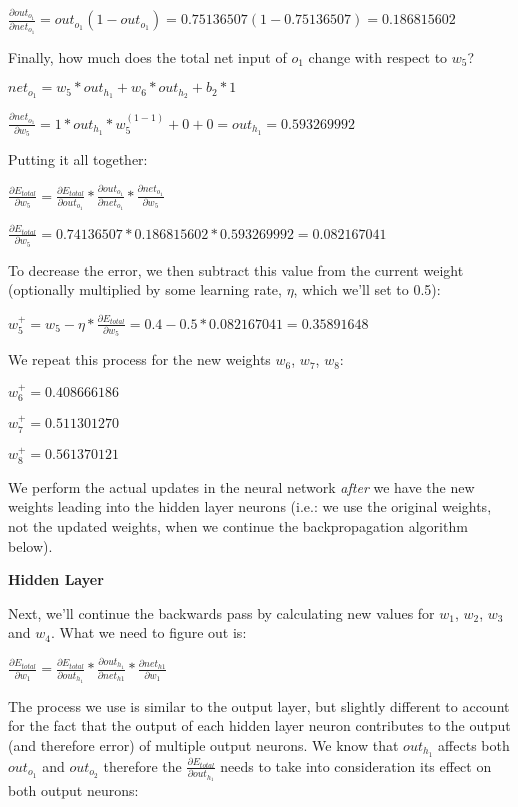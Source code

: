 \documentclass[a4paper]{article}
\begin{document}
$\frac{\partial out_{o_1}}{\partial net_{o_1}}=out_{o_1}(1-out_{o_1})=0.75136507(1-0.75136507)=0.186815602$ 

Finally, how much does the total net input of $o_1$ change with respect to $w_5$?

$net_{o_1}=w_5*out_{h_1}+w_6*out_{h_2}+b_2*1$

$\frac{\partial net_{o_1}}{\partial w_5}=1*out_{h_1}*w_5^{(1-1)}+0+0=out_{h_1}=0.593269992$ 

Putting it all together:

$\frac{\partial E_{total}}{\partial w_5} = \frac{\partial E_{total}}{\partial out_{o_1}} * \frac{\partial out_{o_1}}{\partial net_{o_1}}*\frac{\partial net_{o_1}}{\partial w_5}$

$\frac{\partial E_{total}}{\partial w_5} = 0.74136507*0.186815602*0.593269992=0.082167041$

To decrease the error, we then subtract this value from the current weight (optionally multiplied by some learning rate, $\eta$, which we'll set to 0.5):

$w_5^+=w_5-\eta*\frac{\partial E_{total}}{\partial w_5} = 0.4-0.5*0.082167041=0.35891648$

\bigskip
We repeat this process for the new weights $w_6$, $w_7$, $w_8$:

$w_6^+=0.408666186$

$w_7^+=0.511301270$

$w_8^+=0.561370121$

We perform the actual updates in the neural network \textit{after} we have the new weights leading into the hidden layer neurons (i.e.: we use the original weights, not the updated weights, when we continue the backpropagation algorithm below).

\bigskip
\textbf{Hidden Layer}

Next, we'll continue the backwards pass by calculating new values for $w_1$, $w_2$, $w_3$ and $w_4$. What we need to figure out is:

$\frac{\partial E_{total}}{\partial w_1} = \frac{\partial E_{total}}{\partial out_{h_1}} * \frac{\partial out_{h_1}}{\partial net_{h1}} * \frac{\partial net_{h1}}{\partial w_1}$

The process we use is similar to the output layer, but slightly different to account for the fact that the output of each hidden layer neuron contributes to the output (and therefore error) of multiple output neurons. We know that $out_{h_1}$ affects both $out_{o_1}$ and $out_{o_2}$ therefore the $\frac{\partial E_{total}}{\partial out_{h_1}}$ needs to take into consideration its effect on both output neurons:
\end{document}

